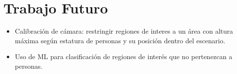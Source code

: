 \documentclass[../memoria.tex]{subfiles}
\begin{document}
\label{conclusiones}

\section*{Trabajo Futuro}
\begin{itemize}
\item Calibración de cámara: restringir regiones de interes a un área con altura máxima según estatura de personas y su posición dentro del escenario.
\item Uso de ML para clasificación de regiones de interés que no pertenezcan a personas.
\end{itemize}
\end{document}
